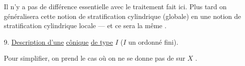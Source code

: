 Il n'y a pas de différence essentielle avec
le traitement fait ici. Plus tard on
généralisera cette notion de stratification
cylindrique (globale) en une notion de
stratification cylindrique locale --- et ce sera
la même .

9. \uline{Description d'une} 
 \uline{cônique} \uline{de type} \(I\)
(\(I\) un ordonné fini).

Pour simplifier, on prend  le cas où on
ne se donne pas de 
sur \(X\) .



